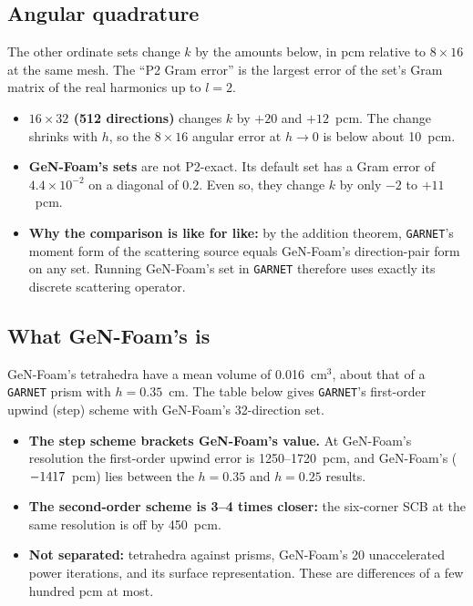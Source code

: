 \documentclass[a4paper,10pt]{article}
\newcommand{\garnet}{\texttt{GARNET}}
\newcommand{\genfoam}{GeN-Foam}
\newcommand{\tablefile}[1]{\begin{center}\resizebox{\ifdim\width>\textwidth\textwidth\else\width\fi}{!}{}\end{center}}
\begin{document}
\subsection{Angular quadrature}

The other ordinate sets change $k$ by the amounts below, in pcm relative to
$8\times16$ at the same mesh. The ``P2 Gram error'' is the largest error of the
set's Gram matrix of the real harmonics up to $l = 2$.

\tablefile{quad}

\begin{itemize}
\item \textbf{$16\times32$ (512 directions)} changes $k$ by $+20$ and
  $+12$~pcm. The change shrinks with $h$, so the $8\times16$ angular error at
  $h \to 0$ is below about 10~pcm.
\item \textbf{\genfoam's sets} are not P2-exact. Its default set has a Gram
  error of $4.4\times10^{-2}$ on a diagonal of $0.2$. Even so, they change $k$
  by only $-2$ to $+11$~pcm.
\item \textbf{Why the comparison is like for like:} by the addition theorem,
  \garnet's moment form of the scattering source equals \genfoam's
  direction-pair form on any set. Running \genfoam's set in \garnet{} therefore
  uses exactly its discrete scattering operator.
\end{itemize}

\subsection{What \genfoam's \kGenFoam{} is}

\genfoam's tetrahedra have a mean volume of 0.016~cm$^3$, about that of a
\garnet{} prism with $h = 0.35$~cm. The table below gives \garnet's first-order
upwind (step) scheme with \genfoam's 32-direction set.

\tablefile{step}

\begin{itemize}
\item \textbf{The step scheme brackets \genfoam's value.} At \genfoam's
  resolution the first-order upwind error is 1250--1720~pcm, and \genfoam's
  \kGenFoam{} ($-1417$~pcm) lies between the $h = 0.35$ and
  $h = 0.25$ results.
\item \textbf{The second-order scheme is 3--4 times closer:} the six-corner
  SCB at the same resolution is off by 450~pcm.
\item \textbf{Not separated:} tetrahedra against prisms, \genfoam's 20
  unaccelerated power iterations, and its surface representation. These are
  differences of a few hundred pcm at most.
\end{itemize}
\end{document}
